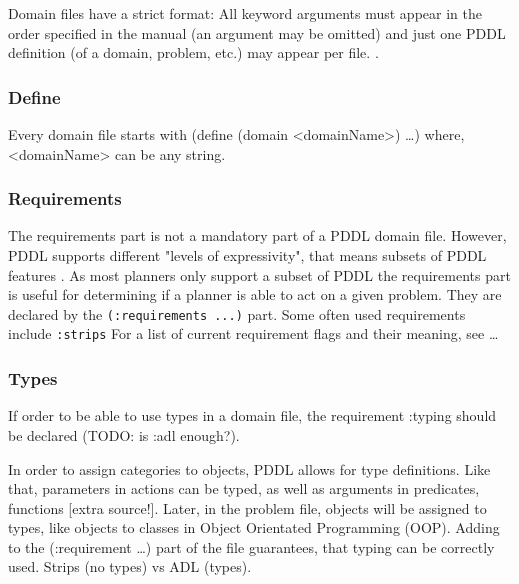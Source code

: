 \documentclass[11pt]{article}
\begin{document}
Domain files have a strict format: All keyword arguments must appear
in the order specified in the manual (an argument may be omitted) and
just one PDDL definition (of a domain, problem, etc.) may appear per
file. \cite[6]{fox2003pddl2}.

\begin{center}
\end{center}

\subsubsection{Define}
\label{sec-3-1-1}
Every domain file starts with (define (domain <domainName>) \ldots{}) where,
<domainName> can be any string.
\subsubsection{Requirements}
\label{sec-3-1-2}
The requirements part is not a mandatory part of a PDDL domain file.
However, PDDL supports different "levels of expressivity", that means
subsets of PDDL features \textcite[1]{mcdermott1998pddl}. As most
planners only support a subset of PDDL the requirements part is useful
for determining if a planner is able to act on a given problem. They
are declared by the \verb~(:requirements ...)~ part. Some often used
requirements include \verb~:strips~ 
For a list of current requirement flags and their meaning, see \ldots{}

\subsubsection{Types}
\label{sec-3-1-3}

If order to be able to use types in a domain file, the
requirement :typing should be declared (TODO: is :adl enough?).

In order to assign categories to objects, PDDL allows for
type definitions. Like that, parameters in actions can be typed, as
well as arguments in predicates, functions [extra source!]. Later, in
the problem file, objects will be assigned to types, like objects to
classes in Object Orientated Programming (OOP). Adding to the
(:requirement \ldots{}) part of the file guarantees, that typing can be
correctly used. Strips (no types) vs ADL (types).
\end{document}
